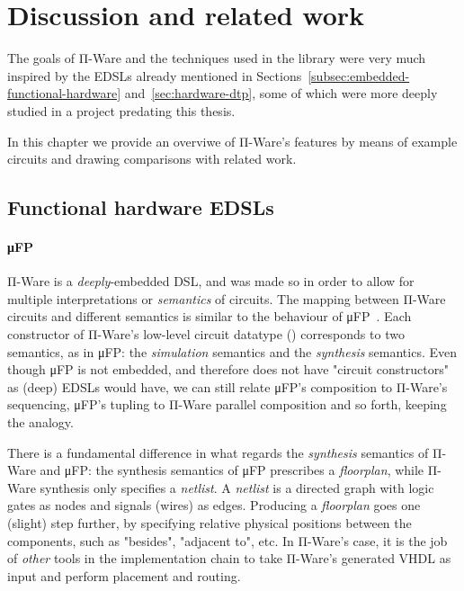 \chapter{Discussion and related work}
\label{chap:discussion-related-work}

    The goals of Π-Ware and the techniques used in the library were very much inspired by the
    \acp{EDSL} already mentioned in Sections~\ref{subsec:embedded-functional-hardware}
    and~\ref{sec:hardware-dtp}, some of which were more deeply studied in a project
    predating this thesis.

    In this chapter we provide an overviwe of Π-Ware's features by means of example circuits and
    drawing comparisons with related work.

    \section{Functional hardware \acp{EDSL}}
    \label{sec:discussion-functional}

        \subsubsection{μFP}
        \label{subsubsec:discussion-mufp}
        Π-Ware is a \emph{deeply}-embedded \ac{DSL}, and was made so in order to allow for multiple
        interpretations or \emph{semantics} of circuits.
        The mapping between Π-Ware circuits and different semantics is similar to the behaviour
        of μFP~\cite{mufp-1984}.
        Each constructor of Π-Ware's low-level circuit datatype () corresponds to two
        semantics, as in μFP: the \emph{simulation} semantics and the \emph{synthesis} semantics.
        Even though μFP is not embedded, and therefore does not have "circuit constructors" as
        (deep) \acp{EDSL} would have, we can still relate μFP's composition to Π-Ware's sequencing,
        μFP's tupling to Π-Ware parallel composition and so forth, keeping the analogy.

        There is a fundamental difference in what regards the \emph{synthesis} semantics of Π-Ware
        and μFP: the synthesis semantics of μFP prescribes a \emph{floorplan}, while Π-Ware synthesis
        only specifies a \emph{netlist}.
        A \emph{netlist} is a directed graph with logic gates as nodes and signals (wires) as edges.
        Producing a \emph{floorplan} goes one (slight) step further, by specifying relative
        physical positions between the components, such as "besides", "adjacent to", etc.
        In Π-Ware's case, it is the job of \emph{other} tools in the implementation chain to take
        Π-Ware's generated \ac{VHDL} as input and perform placement and routing.

